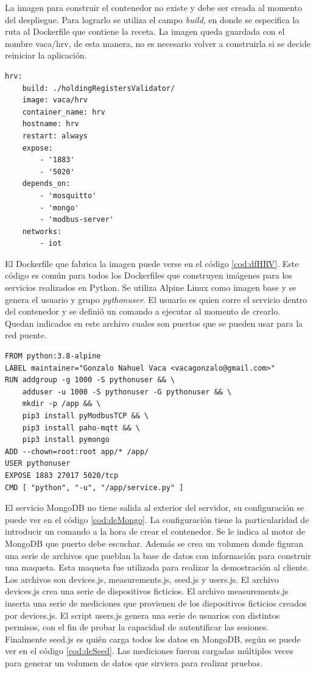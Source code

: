 La imagen para construir el contenedor no existe y debe ser creada al momento del despliegue.
Para lograrlo se utiliza el campo \emph{build}, en donde se especifica la ruta al Dockerfile que contiene la receta.
La imagen queda guardada con el nombre vaca/hrv, de esta manera, no es necesario volver a construirla si se decide reiniciar la aplicación.

\begin{lstlisting}[label=cod:dcHRV,caption=Orquestación del servicio hrv.]
hrv:
	build: ./holdingRegistersValidator/
	image: vaca/hrv
	container_name: hrv
	hostname: hrv
	restart: always
	expose: 
		- '1883'
		- '5020'
	depends_on: 
		- 'mosquitto'
		- 'mongo'
		- 'modbus-server'
	networks: 
		- iot
\end{lstlisting}

El Dockerfile que fabrica la imagen puede verse en el código \ref{cod:dfHRV}.
Este código es común para todos los Dockerfiles que construyen imágenes para los servicios realizados en Python.
Se utiliza Alpine Linux como imagen base y se genera el usuario y grupo \emph{pythonuser}.
El usuario es quien corre el servicio dentro del contenedor y se definió un comando a ejecutar al momento de crearlo.
Quedan indicados en este archivo cuales son puertos que se pueden usar para la red puente.

\begin{lstlisting}[label=cod:dfHRV,caption=Dockerfile del servicio hrv.]
FROM python:3.8-alpine
LABEL maintainer="Gonzalo Nahuel Vaca <vacagonzalo@gmail.com>"
RUN addgroup -g 1000 -S pythonuser && \
	adduser -u 1000 -S pythonuser -G pythonuser && \
	mkdir -p /app && \
	pip3 install pyModbusTCP && \
	pip3 install paho-mqtt && \
	pip3 install pymongo
ADD --chown=root:root app/* /app/
USER pythonuser
EXPOSE 1883 27017 5020/tcp
CMD [ "python", "-u", "/app/service.py" ]
\end{lstlisting}

El servicio MongoDB no tiene salida al exterior del servidor, su configuración se puede ver en el código \ref{cod:dcMongo}.
La configuración tiene la particularidad de introducir un comando a la hora de crear el contenedor.
Se le indica al motor de MongoDB que puerto debe escuchar.
Además se crea un volumen donde figuran una serie de archivos que pueblan la base de datos con información para construir una maqueta.
Esta maqueta fue utilizada para realizar la demostración al cliente.
Los archivos son devices.js, measurements.js, seed.js y users.js.
El archivo devices.js crea una serie de dispositivos ficticios.
El archivo measurements.js inserta una serie de mediciones que provienen de los dispositivos ficticios creados por devices.js.
El script users.js genera una serie de usuarios con distintos permisos, con el fin de probar la capacidad de autentificar las sesiones.
Finalmente seed.js es quién carga todos los datos en MongoDB, según se puede ver en el código \ref{cod:dcSeed}.
Las mediciones fueron cargadas múltiples veces para generar un volumen de datos que sirviera para realizar pruebas.

